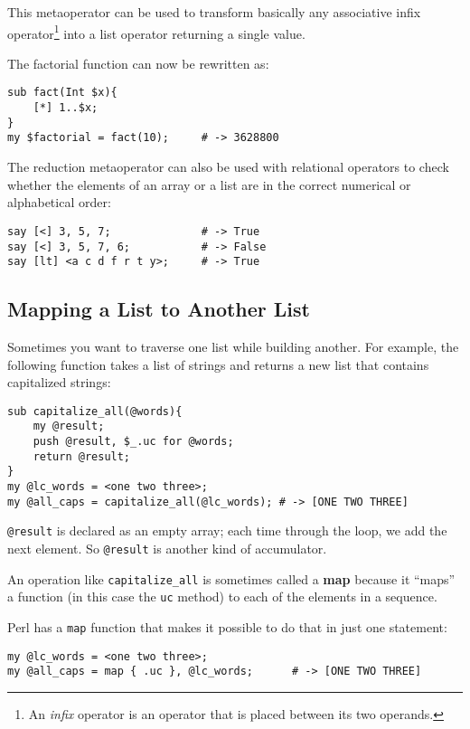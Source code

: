 This metaoperator can be used to transform basically any 
associative infix operator\footnote{An \emph{infix} operator 
is an operator that is placed between its two operands.} 
into a list operator returning a single value.

The factorial function can now be rewritten as:

\begin{verbatim}
sub fact(Int $x){
    [*] 1..$x; 
}
my $factorial = fact(10);     # -> 3628800
\end{verbatim}

The reduction metaoperator can also be used with relational 
operators to check whether the elements of an array or a list 
are in the correct numerical or alphabetical order:

\begin{verbatim}
say [<] 3, 5, 7;              # -> True
say [<] 3, 5, 7, 6;           # -> False
say [lt] <a c d f r t y>;     # -> True
\end{verbatim}

\subsection{Mapping a List to Another List}

Sometimes you want to traverse one list while building
another.  For example, the following function takes a list 
of strings and returns a new list that contains capitalized 
strings:

\begin{verbatim}
sub capitalize_all(@words){
    my @result;
    push @result, $_.uc for @words;
    return @result;
}
my @lc_words = <one two three>;
my @all_caps = capitalize_all(@lc_words); # -> [ONE TWO THREE]
\end{verbatim}
%
\verb'@result' is declared as an empty array; each time through
the loop, we add the next element.  So \verb'@result' is 
another kind of accumulator.

An operation like \verb"capitalize_all" is sometimes called a 
{\bf map} because it ``maps'' a function (in this case the 
{\tt uc} method) to each of the elements in a sequence.

Perl has a {\tt map} function that makes it possible to 
do that in just one statement:

\begin{verbatim}
my @lc_words = <one two three>;
my @all_caps = map { .uc }, @lc_words;      # -> [ONE TWO THREE]
\end{verbatim}
%

